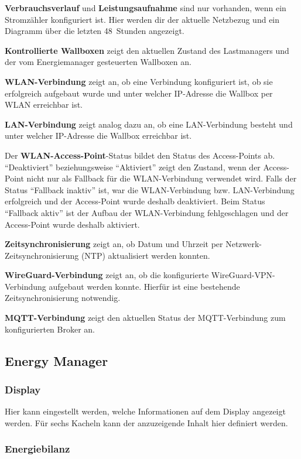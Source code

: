 \documentclass[a4paper,10pt]{article}
\begin{document}
\begin{multicols*}{2}
	\textbf{Verbrauchsverlauf} und \textbf{Leistungsaufnahme} sind nur vorhanden, wenn ein Stromzähler konfiguriert ist.
	Hier werden dir der aktuelle Netzbezug und ein Diagramm über
	die letzten 48~Stunden angezeigt.

	\textbf{Kontrollierte Wallboxen} zeigt den aktuellen Zustand des Lastmanagers und der vom Energiemanager gesteuerten
	Wallboxen an.

	\textbf{WLAN-Verbindung} zeigt an, ob eine Verbindung konfiguriert ist, ob sie erfolgreich aufgebaut wurde und
	unter welcher IP-Adresse die Wallbox per WLAN erreichbar ist.

	\textbf{LAN-Verbindung} zeigt analog dazu an, ob eine LAN-Verbindung besteht und unter welcher IP-Adresse die Wallbox erreichbar ist.

	Der \textbf{WLAN-Access-Point}-Status bildet den Status des Access-Points ab.
	\enquote{Deaktiviert} beziehungsweise \enquote{Aktiviert} zeigt den Zustand, wenn der Access-Point nicht
	nur als Fallback für die WLAN-Verbindung verwendet wird. Falls der Status \enquote{Fallback inaktiv} ist,
	war die WLAN-Verbindung bzw. LAN-Verbindung erfolgreich und der Access-Point wurde deshalb deaktiviert.
	Beim Status \enquote{Fallback aktiv} ist der Aufbau der WLAN-Verbindung fehlgeschlagen und der
	Access-Point wurde deshalb aktiviert.

	\textbf{Zeitsynchronisierung} zeigt an, ob Datum und Uhrzeit per Netzwerk-Zeitsynchronisierung (NTP) aktualisiert werden konnten.

	\textbf{WireGuard-Verbindung} zeigt an, ob die konfigurierte WireGuard-VPN-Verbindung aufgebaut werden konnte. Hierfür ist eine bestehende Zeitsynchronisierung notwendig.

	\textbf{MQTT-Verbindung} zeigt den aktuellen Status der MQTT-Verbindung
	zum konfigurierten Broker an.

    \subsection{Energy Manager}
    \subsubsection{Display}
    Hier kann eingestellt werden, welche Informationen auf dem Display angezeigt werden. Für sechs Kacheln kann der anzuzeigende Inhalt hier definiert werden.
    
	\subsubsection{Energiebilanz}


\end{multicols*}
\end{document}
